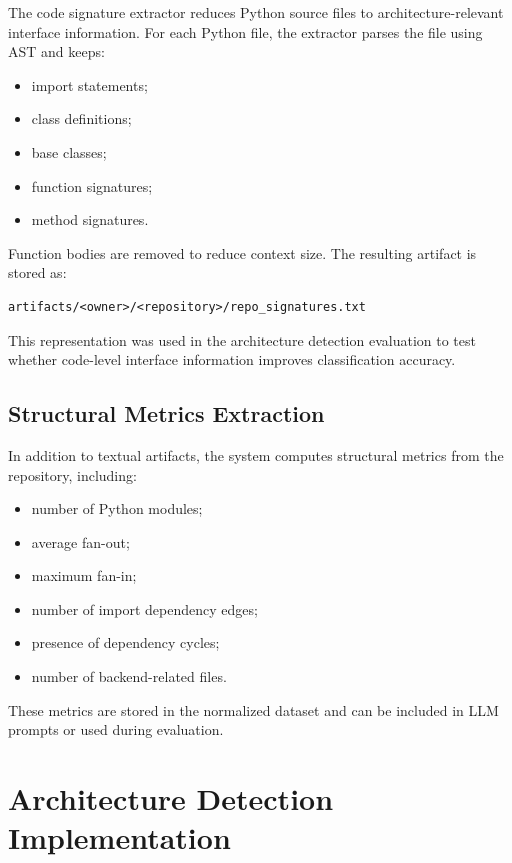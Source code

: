 The code signature extractor reduces Python source files to architecture-relevant interface information. For each Python file, the extractor parses the file using AST and keeps:

\begin{itemize}
    \item import statements;
    \item class definitions;
    \item base classes;
    \item function signatures;
    \item method signatures.
\end{itemize}

Function bodies are removed to reduce context size. The resulting artifact is stored as:

\begin{verbatim}
artifacts/<owner>/<repository>/repo_signatures.txt
\end{verbatim}

This representation was used in the architecture detection evaluation to test whether code-level interface information improves classification accuracy.

\subsection{Structural Metrics Extraction}

In addition to textual artifacts, the system computes structural metrics from the repository, including:

\begin{itemize}
    \item number of Python modules;
    \item average fan-out;
    \item maximum fan-in;
    \item number of import dependency edges;
    \item presence of dependency cycles;
    \item number of backend-related files.
\end{itemize}

These metrics are stored in the normalized dataset and can be included in LLM prompts or used during evaluation.

\section{Architecture Detection Implementation}

